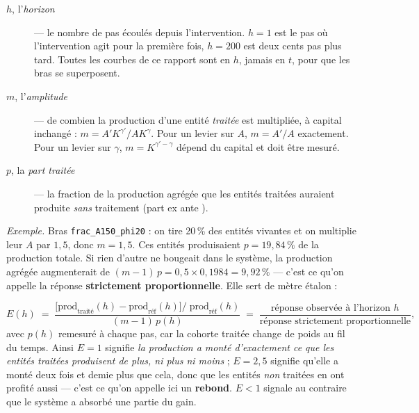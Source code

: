 \documentclass[11pt,a4paper]{article}
\newcommand{\code}[1]{\texttt{#1}}
\begin{document}
\begin{description}
\item[$h$, l'\emph{horizon}] --- le nombre de pas écoulés depuis
  l'intervention. $h=1$ est le pas où l'intervention agit pour la première
  fois, $h=200$ est deux cents pas plus tard. Toutes les courbes de ce
  rapport sont en $h$, jamais en $t$, pour que les bras se superposent.
\item[$m$, l'\emph{amplitude}] --- de combien la production d'une entité
  \emph{traitée} est multipliée, à capital inchangé :
  $m = A' K^{\gamma'} / A K^{\gamma}$. Pour un levier sur $A$, $m = A'/A$
  exactement. Pour un levier sur $\gamma$, $m = K^{\gamma'-\gamma}$ dépend
  du capital et doit être mesuré.
\item[$p$, la \emph{part traitée}] --- la fraction de la production agrégée
  que les entités traitées auraient produite \emph{sans} traitement (part
  \og ex ante \fg{}).
\end{description}

\noindent\emph{Exemple.} Bras \code{frac\_A150\_phi20} : on tire 20\,\% des
entités vivantes et on multiplie leur $A$ par $1{,}5$, donc $m = 1{,}5$. Ces
entités produisaient $p = 19{,}84\,\%$ de la production totale. Si rien
d'autre ne bougeait dans le système, la production agrégée augmenterait de
$(m-1)\,p = 0{,}5 \times 0{,}1984 = 9{,}92\,\%$ --- c'est ce qu'on appelle la
réponse \textbf{strictement proportionnelle}. Elle sert de mètre étalon :

\begin{equation}
E(h) \;=\; \frac{\big[\mathrm{prod}_{\text{traité}}(h)-\mathrm{prod}_{\text{réf}}(h)\big]
/\;\mathrm{prod}_{\text{réf}}(h)}{(m-1)\,p(h)}
\;=\;
\frac{\text{réponse observée à l'horizon } h}{\text{réponse strictement proportionnelle}},
\label{eq:elasticite}
\end{equation}
avec $p(h)$ remesuré à chaque pas, car la cohorte traitée change de poids au
fil du temps. Ainsi $E = 1$ signifie \emph{la production a monté d'exactement
ce que les entités traitées produisent de plus, ni plus ni moins} ;
$E = 2{,}5$ signifie qu'elle a monté deux fois et demie plus que cela, donc
que les entités \emph{non} traitées en ont profité aussi --- c'est ce qu'on
appelle ici un \textbf{rebond}. $E < 1$ signale au contraire que le système
a absorbé une partie du gain.
\end{document}
